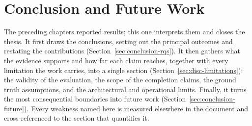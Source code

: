 %
%
%
\chapter{Conclusion and Future Work}
\label{ch:conclusion}

The preceding chapters reported results; this one interprets them and closes the
thesis. It first draws the conclusions, setting out the principal outcomes and
restating the contributions (Section~\ref{sec:conclusion-rqs}). It then gathers what the
evidence supports and how far each claim reaches, together with every limitation the
work carries, into a single section (Section~\ref{sec:disc-limitations}): the
validity of the evaluation, the scope of the completion claims, the ground truth
assumptions, and the architectural and operational limits. Finally, it turns the
most consequential boundaries into future work (Section~\ref{sec:conclusion-future}).
Every weakness named here is measured elsewhere in the document and cross-referenced to
the section that quantifies it.

